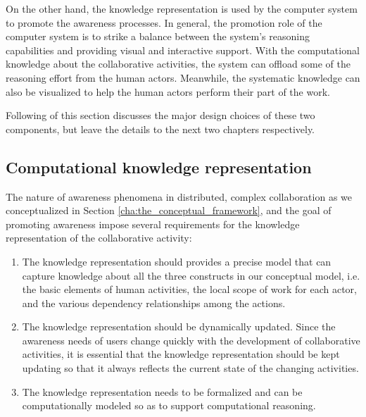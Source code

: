 On the other hand, the knowledge representation is used by the computer system to promote the awareness processes. In general, the promotion role of the computer system is to strike a balance between the system's reasoning capabilities and providing visual and interactive support. With the computational knowledge about the collaborative activities, the system can offload some of the reasoning effort from the human actors. Meanwhile, the systematic knowledge can also be visualized to help the human actors perform their part of the work. 

Following of this section discusses the major design choices of these two components, but leave the details to the next two chapters respectively.

\subsection{Computational knowledge representation} %
\label{sub:computational_knowledge_representation}
The nature of awareness phenomena in distributed, complex collaboration as we conceptualized in Section \ref{cha:the_conceptual_framework}, and the goal of promoting awareness impose several requirements for the knowledge representation of the collaborative activity:

\begin{enumerate}
   \item The knowledge representation should provides a precise model that can capture knowledge about all the three constructs in our conceptual model, i.e. the basic elements of human activities, the local scope of work for each actor, and the various dependency relationships among the actions. 
   \item The knowledge representation should be dynamically updated. Since the awareness needs of users change quickly with the development of collaborative activities, it is essential that the knowledge representation should be kept updating so that it always reflects the current state of the changing activities.
   \item The knowledge representation needs to be formalized and can be computationally modeled so as to support computational reasoning.
\end{enumerate}

